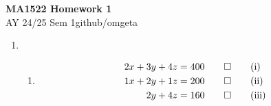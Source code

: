 \documentclass[12pt, a4paper]{article}
\newcommand{\mytitle}{MA1522 Homework 1}
\newcommand{\myauthor}{github/omgeta}
\newcommand{\mydate}{AY 24/25 Sem 1}
\begin{document}
\raggedright
\footnotesize
\begin{center}
{\normalsize{\textbf{\mytitle}}} \\
{\footnotesize{\mydate\hspace{2pt}\textemdash\hspace{2pt}\myauthor}}
\end{center}

\begin{enumerate}[Q\arabic*.]
  \item 
    \begin{enumerate}[(\alph*)]
      \item \begin{align*}
          2x + 3y + 4z &= 400\qed\tag*{(i)}\\
          1x + 2y + 1z &= 200\qed\tag*{(ii)}\\
          2y + 4z &= 160\qed\tag*{(iii)}\\
        \end{align*}


\end{enumerate}
\end{enumerate}
\end{document}
